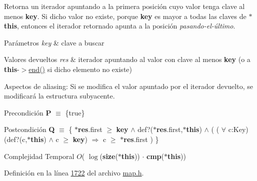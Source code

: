 Retorna un iterador apuntando a la primera posición cuyo valor tenga clave al menos {\bfseries key}. Si dicho valor no existe, porque {\bfseries key} es mayor a todas las claves de {\bfseries $\ast$this}, entonces el iterador retornado apunta a la posición {\itshape pasando-\/el-\/último}.


\begin{DoxyParams}{Parámetros}
{\em key} & clave a buscar \\
\hline
\end{DoxyParams}

\begin{DoxyRetVals}{Valores devueltos}
{\em res} & iterador apuntando al valor con clave al menos {\bfseries key} (o a {\bfseries this}-\/$>$\hyperlink{classaed2_1_1map_a76023e6a56cb625513e1b5ea028bf983_a76023e6a56cb625513e1b5ea028bf983}{end()} si dicho elemento no existe)\\
\hline
\end{DoxyRetVals}
\begin{DoxyParagraph}{Aspectos de aliasing\-:}
Si se modifica el valor apuntado por el iterador devuelto, se modificará la estructura subyacente.
\end{DoxyParagraph}
\begin{DoxyPrecond}{Precondición}
{\bfseries P} $\equiv$ \{true\} 
\end{DoxyPrecond}
\begin{DoxyPostcond}{Postcondición}
{\bfseries Q} $\equiv$ \{ {\bfseries $\ast$res}.first $\geq$ {\bfseries key} $\land$ def?({\bfseries $\ast$res}.first,{\bfseries $\ast$this}) $\land$ ( ( $\forall$ c\-:Key) (def?(c,{\bfseries $\ast$this}) $\land$ c $\geq$ {\bfseries key}) $\Rightarrow$ c $\geq$ {\bfseries $\ast$res}.first ) \}
\end{DoxyPostcond}

\begin{DoxyDescription}
\item[Complejidad Temporal]$O$( $\log$({\bfseries size}({\bfseries $\ast$this})) $\cdot$ {\bfseries cmp}({\bfseries $\ast$this}))
\end{DoxyDescription}

Definición en la línea \hyperlink{map_8h_source_l01722}{1722} del archivo \hyperlink{map_8h_source}{map.\-h}.

